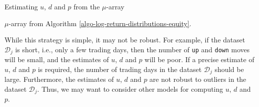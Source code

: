 \documentclass[11pt]{article}
\theoremstyle{definition}
\begin{document}
\begin{algorithm}[h]
	\caption{Estimating $u$, $d$ and $p$ from the $\mu$-array}\label{algo-ud-estimation-equity}
	\begin{algorithmic}[1]

		\Require $\mu$-array from Algorithm \ref{algo-log-return-distributions-equity}.

		\Statex
		
		\Statex
    	\EndFor
    	
		\Statex
    	\EndFor

		\Statex

		\Statex
	\end{algorithmic}
\end{algorithm}
While this strategy is simple, it may not be robust. For example, if the dataset $\mathcal{D}_{j}$ is short, i.e., only a few trading days,
then the number of \texttt{up} and \texttt{down} moves will be small, and the estimates of $u$, $d$ and $p$ will be poor.
If a precise estimate of $u$, $d$ and $p$ is required, the number of trading days in the dataset $\mathcal{D}_{j}$ should be large.
Furthermore, the estimates of $u$, $d$ and $p$ are not robust to outliers in the dataset $\mathcal{D}_{j}$.
Thus, we may want to consider other models for computing $u$, $d$ and $p$.
\end{document}
